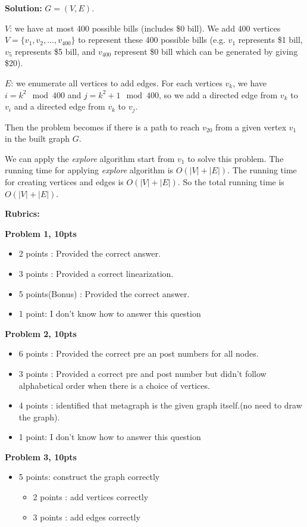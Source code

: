 \documentclass[11pt]{article}
\begin{document}
\begin{qunlist}
\textbf{Solution:} 
$G = (V, E)$.

$V$: we have at most 400 possible bills (includes \$0 bill). We add 400 vertices $V = \{v_1, v_2, ..., v_{400}\}$ to represent these 400 possible bills (e.g. $v_1$ represents \$1 bill, $v_5$ represents \$5 bill, and $v_{400}$ represent \$0 bill which can be generated by giving \$20). 

$E$: we enumerate all vertices to add edges. For each vertices $v_k$, we have $i = k^2 \mod 400$ and $j = k^2 +1 \mod 400$, so we add a directed edge from $v_k$ to $v_i$ and a directed edge from $v_k$ to $v_j$.

Then the problem becomes if there is a path to reach $v_{20}$ from a given vertex $v_1$ in the built graph $G$.

We can apply the \emph{explore} algorithm start from $v_1$ to solve this problem. The running time for applying \emph{explore} algorithm is $O(|V|+|E|)$. The running time for creating vertices and edges is $O(|V|+|E|)$. So the total running time is $O(|V|+|E|)$.

\newpage
{\huge {\bf Rubrics:}}

\bigskip


{\bf Problem 1, 10pts}
\begin{itemize}
    \item 2 points : Provided the correct answer.
    \item 3 points : Provided a correct linearization.
    \item 5 points(Bonus) : Provided the correct answer.
    \item 1 point: I don't know how to answer this question
\end{itemize}
{\bf Problem 2, 10pts}
\begin{itemize}
    \item 6 points : Provided the correct pre an post numbers for all nodes.
    \item 3 points : Provided a correct pre and post number but didn't follow alphabetical order when there is a choice of vertices.
    \item 4 points : identified that metagraph is the given graph itself.(no need to draw the graph).
    \item 1 point: I don't know how to answer this question
\end{itemize}

{\bf Problem 3, 10pts}
\begin{itemize}
    \item 5 points: construct the graph correctly
    \begin{itemize}
        \item 2 points : add vertices correctly
        \item 3 points : add edges correctly
    \end{itemize}


\end{itemize}
\end{qunlist}
\end{document}
